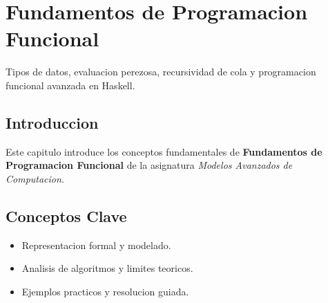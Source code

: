 \chapter{Fundamentos de Programacion Funcional}
\label{ch:programacion_funcional}

Tipos de datos, evaluacion perezosa, recursividad de cola y programacion funcional avanzada en Haskell.

\section{Introduccion}
Este capitulo introduce los conceptos fundamentales de \textbf{Fundamentos de Programacion Funcional} de la asignatura \textit{Modelos Avanzados de Computacion}.

\section{Conceptos Clave}
\begin{itemize}
    \item Representacion formal y modelado.
    \item Analisis de algoritmos y limites teoricos.
    \item Ejemplos practicos y resolucion guiada.
\end{itemize}
